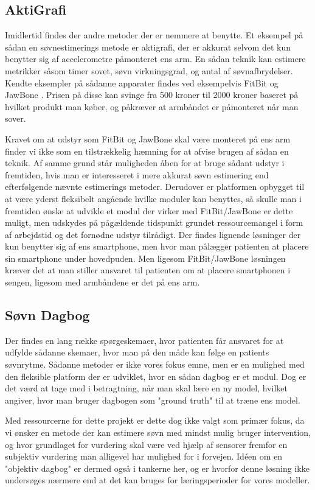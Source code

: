 \subsection{AktiGrafi}
Imidlertid findes der andre metoder der er nemmere at benytte.
Et eksempel på sådan en søvnestimerings metode er aktigrafi, der er akkurat selvom det kun benytter sig af accelerometre påmonteret ens arm.
En sådan teknik kan estimere metrikker såsom timer sovet, søvn virkningsgrad, og antal af søvnafbrydelser.
Kendte eksempler på sådanne apparater findes ved eksempelvis FitBit og JawBone \citep{misc:fitbitSleepTracking} \citep{misc:jawBoneSleepTracking}.
Prisen på disse kan svinge fra 500 kroner til 2000 kroner baseret på hvilket produkt man køber, og påkræver at armbåndet er påmonteret når man sover.

Kravet om at udstyr som FitBit og JawBone skal være monteret på ens arm finder vi ikke som en tilstrækkelig hæmning for at afvise brugen af sådan en teknik.
Af samme grund står muligheden åben for at bruge sådant udstyr i fremtiden, hvis man er interesseret i mere akkurat søvn estimering end efterfølgende nævnte estimerings metoder.
Derudover er platformen opbygget til at være yderst fleksibelt angående hvilke moduler kan benyttes, så skulle man i fremtiden ønske at udvikle et modul der virker med FitBit/JawBone er dette muligt, men udskydes på pågældende tidspunkt grundet ressourcemangel i form af arbejdstid og det fornødne udstyr tilrådigt.
Der findes lignende løsninger der kun benytter sig af ens smartphone, men hvor man pålægger patienten at placere sin smartphone under hovedpuden.
Men ligesom FitBit/JawBone løsningen kræver det at man stiller ansvaret til patienten om at placere smartphonen i sengen, ligesom med armbåndene er det på ens arm.

\subsection{Søvn Dagbog}
Der findes en lang række spørgeskemaer, hvor patienten får ansvaret for at udfylde sådanne skemaer, hvor man på den måde kan følge en patients søvnrytme.
Sådanne metoder er ikke vores fokus emne, men er en mulighed med den fleksible platform der er udviklet, hvor en sådan dagbog er et modul.
Dog er det værd at tage med i betragtning, når man skal lære en ny model, hvilket \cite{Min:2014:TNT:2556288.2557220} angiver, hvor man bruger dagbogen som "ground truth" til at træne ens model.

Med ressourcerne for dette projekt er dette dog ikke valgt som primær fokus, da vi ønsker en metode der kan estimere søvn med mindst mulig bruger intervention, og hvor grundlaget for vurdering skal være ved hjælp af sensorer fremfor en subjektiv vurdering man alligevel har mulighed for i forvejen.
Idéen om en "objektiv dagbog" er dermed også i tankerne her, og er hvorfor denne løsning ikke undersøges nærmere end at det kan bruges for læringsperioder for vores modeller.

